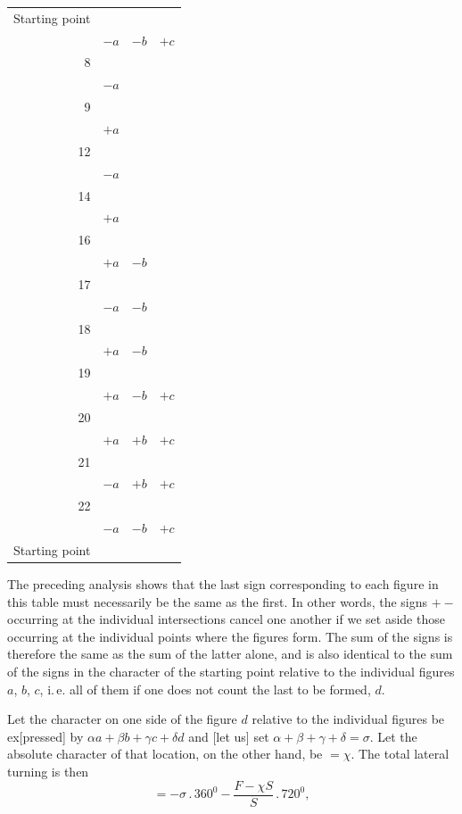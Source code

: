 %
\begin{center}\begin{tabular}{r|ccc}
Starting point&&&\\
&$-a$&$-b$&$+c$\\
8&&&\\
&$-a$&&\\
9&&&\\
&$+a$&&\\
12&&&\\
&$-a$&&\\
14&&&\\
&$+a$&&\\
16&&&\\
&$+a$&$-b$&\\
17&&&\\
&$-a$&$-b$&\\
18&&&\\
&$+a$&$-b$&\\
19&&&\\
&$+a$&$-b$&$+c$\\
20&&&\\
&$+a$&$+b$&$+c$\\
21&&&\\
&$-a$&$+b$&$+c$\\
22&&&\\
&$-a$&$-b$&$+c$\\
Starting point&&&\\
\end{tabular}\end{center}
The preceding analysis shows that the last sign corresponding
to each figure in this table must necessarily be the same
as the first. In other words, the signs $+-$ occurring at the individual
intersections cancel one another if we set aside those occurring at the
individual points where the figures form.
The sum of  the signs is therefore the same as the sum of the latter alone, and
is also identical to the sum of the signs in the character of the
starting point relative to the individual figures $a$, $b$, $c$, i.\,e. all of them
if one does not count the last to be formed, $d$.
\par{}
Let the character on one side of the figure $d$ relative to the individual
figures be ex[pressed] by $\alpha a+\beta b+\gamma c+\delta d$
and [let us] set $\alpha+\beta+\gamma+\delta=\sigma$. Let the absolute
character of that location, on the other hand, be $=\chi$. The total
lateral turning is then
\[
= -\sigma\,.\,360^0 - \frac{F-\chi S}{S}\,.\,720^0,
\]
